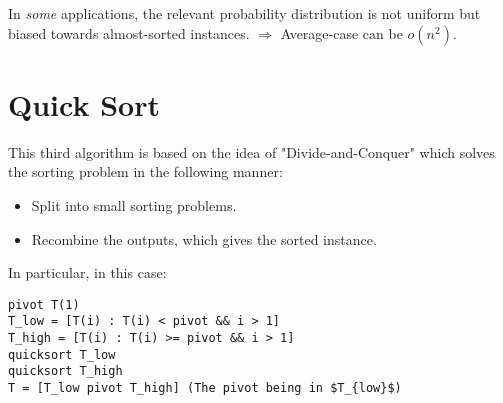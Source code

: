 In \emph{some} applications, the relevant probability distribution is not uniform but biased towards almost-sorted instances.   \newline 
$\Rightarrow$ Average-case can be $o(n^2)$. 

\section{Quick Sort}
This third algorithm is based on the idea of "Divide-and-Conquer" which solves the sorting problem in the following manner:

\begin{itemize}
\renewcommand{\labelitemi}{$\bullet$}
	\item Split into small sorting problems.
	\item Recombine the outputs, which gives the sorted instance.
\end{itemize}

In particular, in this case:

\begin{lstlisting}[label={list:c1:quick},caption=Pseudo-code of the quick sort algorithm]
pivot T(1)
T_low = [T(i) : T(i) < pivot && i > 1]
T_high = [T(i) : T(i) >= pivot && i > 1]
quicksort T_low
quicksort T_high
T = [T_low pivot T_high] (The pivot being in $T_{low}$)
\end{lstlisting}

